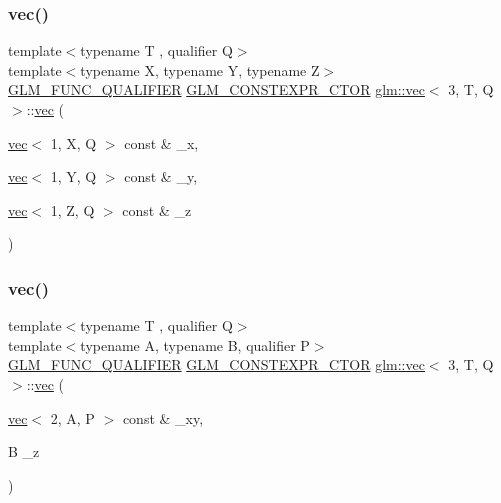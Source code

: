 \mbox{\label{structglm_1_1vec_3_013_00_01_t_00_01_q_01_4_ae438a8844a761acd9174ec18eea6de5a}} 
\subsubsection{\texorpdfstring{vec()}{vec()}\hspace{0.1cm}{\footnotesize\ttfamily [17/23]}}
{\footnotesize\ttfamily template$<$typename T , qualifier Q$>$ \\
template$<$typename X, typename Y, typename Z$>$ \\
\mbox{\hyperlink{setup_8hpp_a33fdea6f91c5f834105f7415e2a64407}{G\+L\+M\+\_\+\+F\+U\+N\+C\+\_\+\+Q\+U\+A\+L\+I\+F\+I\+ER}} \mbox{\hyperlink{setup_8hpp_ad34178a09666081abdb573c14d1f4a5a}{G\+L\+M\+\_\+\+C\+O\+N\+S\+T\+E\+X\+P\+R\+\_\+\+C\+T\+OR}} \mbox{\hyperlink{structglm_1_1vec}{glm\+::vec}}$<$ 3, T, Q $>$\+::\mbox{\hyperlink{structglm_1_1vec}{vec}} (\begin{DoxyParamCaption}\item[{\mbox{\hyperlink{structglm_1_1vec}{vec}}$<$ 1, X, Q $>$ const \&}]{\+\_\+x,  }\item[{\mbox{\hyperlink{structglm_1_1vec}{vec}}$<$ 1, Y, Q $>$ const \&}]{\+\_\+y,  }\item[{\mbox{\hyperlink{structglm_1_1vec}{vec}}$<$ 1, Z, Q $>$ const \&}]{\+\_\+z }\end{DoxyParamCaption})}

\mbox{\label{structglm_1_1vec_3_013_00_01_t_00_01_q_01_4_a611e956498c0d144b8ba94638e86fca9}} 
\subsubsection{\texorpdfstring{vec()}{vec()}\hspace{0.1cm}{\footnotesize\ttfamily [18/23]}}
{\footnotesize\ttfamily template$<$typename T , qualifier Q$>$ \\
template$<$typename A, typename B, qualifier P$>$ \\
\mbox{\hyperlink{setup_8hpp_a33fdea6f91c5f834105f7415e2a64407}{G\+L\+M\+\_\+\+F\+U\+N\+C\+\_\+\+Q\+U\+A\+L\+I\+F\+I\+ER}} \mbox{\hyperlink{setup_8hpp_ad34178a09666081abdb573c14d1f4a5a}{G\+L\+M\+\_\+\+C\+O\+N\+S\+T\+E\+X\+P\+R\+\_\+\+C\+T\+OR}} \mbox{\hyperlink{structglm_1_1vec}{glm\+::vec}}$<$ 3, T, Q $>$\+::\mbox{\hyperlink{structglm_1_1vec}{vec}} (\begin{DoxyParamCaption}\item[{\mbox{\hyperlink{structglm_1_1vec}{vec}}$<$ 2, A, P $>$ const \&}]{\+\_\+xy,  }\item[{B}]{\+\_\+z }\end{DoxyParamCaption})}

